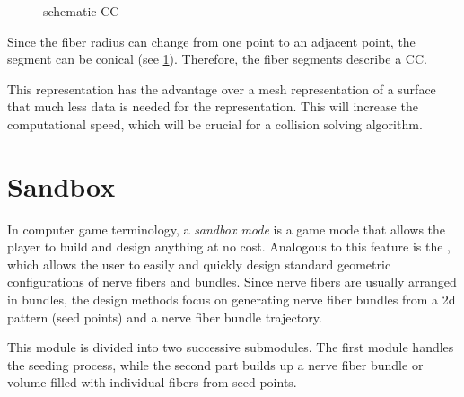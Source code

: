 %
\begin{figure}[!t]
    \centering
    \setlength{\tikzwidth}{0.5\textwidth}
	\caption{schematic  \ac{CC}}
	\label{fig:conical}
\end{figure}
%
Since the fiber radius can change from one point to an adjacent point, the segment can be conical (see \cref{fig:conical}).
Therefore, the fiber segments describe a \ac{CC}.
\par
%
This representation has the advantage over a mesh representation of a surface that much less data is needed for the representation.
This will increase the computational speed, which will be crucial for a collision solving algorithm.
%
% 
% 
\section{Sandbox}\label{sec:sandbox}
%
In computer game terminology, a \textit{sandbox mode} is a game mode that allows the player to build and design anything at no cost.
Analogous to this feature is the , which allows the user to easily and quickly design standard geometric configurations of nerve fibers and bundles.
Since nerve fibers are usually arranged in bundles, the design methods focus on generating nerve fiber bundles from a 2d pattern (seed points) and a nerve fiber bundle trajectory.
\par
%
This module is divided into two successive submodules.
The first module handles the seeding process, while the second part builds up a nerve fiber bundle or volume filled with individual fibers from seed points.
%
